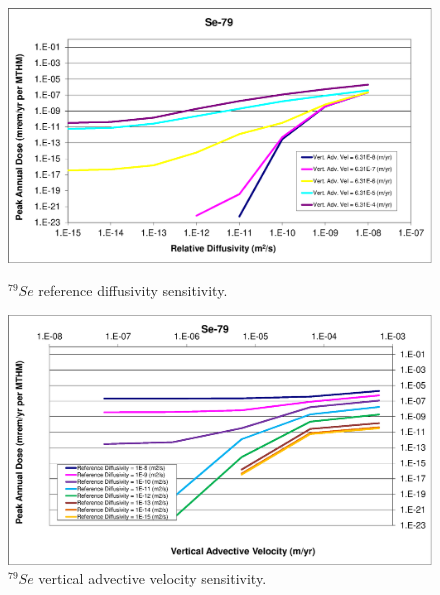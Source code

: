 \begin{figure}[htp!]
\begin{minipage}[b]{0.45\linewidth}
\centering
\includegraphics[width=\linewidth]{./chapters/nuclide_sensitivity/clay/AdvVelAndDiffCoeffEBSFail/Se-79.eps}
\caption{$^{79}Se$ reference diffusivity sensitivity.}
\label{fig:VAdvVelSe79}

\end{minipage}
\hspace{0.05\linewidth}
\begin{minipage}[b]{0.45\linewidth}

\includegraphics[width=\linewidth]{./chapters/nuclide_sensitivity/clay/AdvVelAndDiffCoeffEBSFail/Se-79-VAdvVel.eps}
\caption{$^{79}Se$ vertical advective velocity sensitivity.}
\label{fig:VAdvVelSe79VAdvVel}

\end{minipage}
\end{figure}
\clearpage
